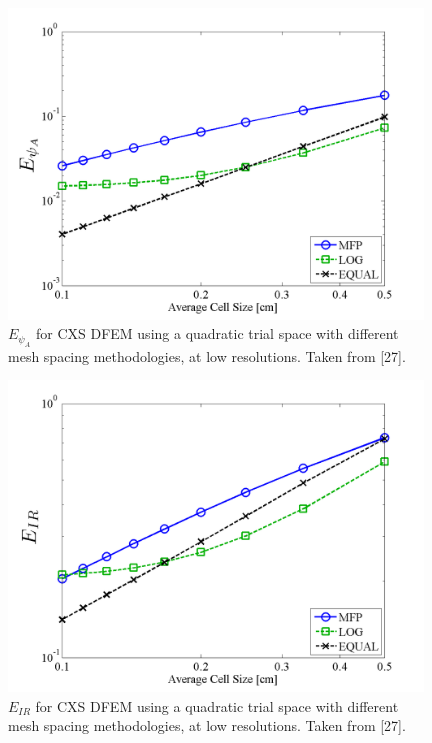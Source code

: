 \begin{figure}[!htp]
\centering
\includegraphics[width=11cm]{chapter3_variable_xs/LOW_RES_P2_CXS_E_PSI_A.png}
\caption{$E_{\psi_A}$ for CXS DFEM using a quadratic trial space  with different mesh spacing methodologies, at low resolutions.  Taken from [27].}
\label{fig:low_res_cxs_psi_A}
\end{figure}
%
\begin{figure}[!hbp]
\centering
\includegraphics[width=11cm]{chapter3_variable_xs/LOW_RES_P2_CXS_E_IR.png}
\caption{$E_{IR}$ for CXS DFEM using a quadratic trial space  with different mesh spacing methodologies, at low resolutions.  Taken from [27].}
\label{fig:low_res_cxs_ir}
\end{figure}
%
